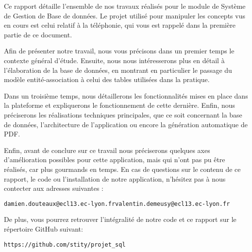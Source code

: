 \label{sec:introduction}
Ce rapport détaille l'ensemble de nos travaux réalisés pour le module de Système de Gestion de Base de données. Le projet utilisé pour manipuler les concepts vus en cours est celui relatif à la téléphonie, qui vous est rappelé dans la première partie de ce document.

Afin de présenter notre travail, nous vous précisons dans un premier temps le contexte général d'étude. Ensuite, nous nous intéresserons plus en détail à l'élaboration de la base de données, en montrant en particulier le passage du modèle entité-association à celui des tables utilisées dans la pratique.

Dans un troisième temps, nous détaillerons les fonctionnalités mises en place dans la plateforme et expliquerons le fonctionnement de cette dernière. Enfin, nous préciserons les réalisations techniques principales, que ce soit concernant la base de données, l'architecture de l'application ou encore la génération automatique de PDF.

Enfin, avant de conclure sur ce travail nous préciserons quelques axes d'amélioration possibles pour cette application, mais qui n'ont pas pu être réalisés, car plus gourmands en temps.
\vspace*{.5cm}
En cas de questions sur le contenu de ce rapport, le code ou l'installation de notre application, n'hésitez pas à nous contecter aux adresses suivantes :
\begin{center}
\texttt{damien.douteaux@ecl13.ec-lyon.fr}\hspace{2cm}\texttt{valentin.demeusy@ecl13.ec-lyon.fr}
\end{center}
De plus, vous pourrez retrouver l'intégralité de notre code et ce rapport sur le répertoire GitHub suivant:
\begin{center}
  \texttt{https://github.com/stity/projet\_sql}
\end{center}

\vspace*{2cm}
\noindent{}

